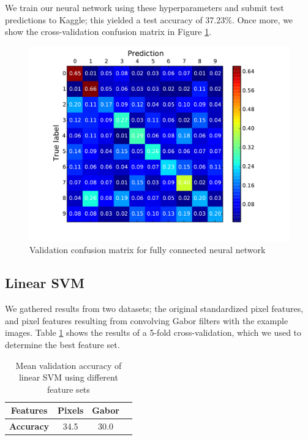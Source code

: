 \documentclass{acm_proc_article-sp}
\begin{document}
We train our neural network using these hyperparameters and submit test predictions to Kaggle; this yielded a test accuracy of 37.23\%. Once more, we show the cross-validation confusion matrix in Figure \ref{fig:nn-conf}.

\begin{figure}[h!]
	\centering
	\includegraphics[width=\linewidth]{neuralnet_confusion}
  	\caption{Validation confusion matrix for fully connected neural network}
  	\label{fig:nn-conf}
\end{figure}

\subsection{Linear SVM}
We gathered results from two datasets; the original standardized pixel features, and pixel features resulting from convolving Gabor filters with the example images. Table \ref{tab:svm-features} shows the results of a 5-fold cross-validation, which we used to determine the best feature set. 

\begin{table}[h!]
  \centering
  \begin{tabular}{|c||c|c|c| }
    \hline
    {\bfseries Features} & Pixels & Gabor \\
    \hline
    {\bfseries Accuracy} & 34.5 & 30.0 \\
    \hline
  \end{tabular}
  \caption{Mean validation accuracy of linear SVM using different feature sets}
  \label{tab:svm-features}
\end{table}
\end{document}
